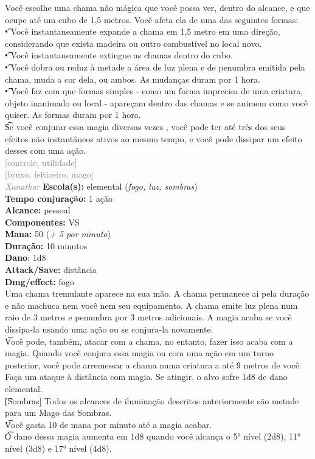\documentclass{RPG_Adventure}[2021/10/20]
\begin{document}
{\normalsize Você escolhe uma chama não mágica que você possa ver, dentro do alcance, e que ocupe até um cubo de 1,5 metros. Você afeta ela de uma das seguintes formas:\\\t • Você instantaneamente expande a chama em 1,5 metro em uma direção, considerando que exista madeira ou outro combustível no local novo.\\\t • Você instantaneamente extingue as chamas dentro do cubo.\\\t • Você dobra ou reduz à metade a área de luz plena e de penumbra emitida pela chama, muda a cor dela, ou ambos. As mudanças duram por 1 hora.\\\t • Você faz com que formas simples - como um forma imprecisa de uma criatura, objeto inanimado ou local - apareçam dentro das chamas e se animem como você quiser. As formas duram por 1 hora.\\\t Se você conjurar essa magia diversas vezes , você pode ter até três dos seus efeitos não instantâneos ativos ao mesmo tempo, e você pode dissipar um efeito desses com uma ação.\\}
{\scriptsize \textcolor{gray}{[controle, utilidade]\\}}
{\scriptsize \textcolor{gray}{[bruxo, feiticeiro, mago]\\}}
{\tiny \textcolor{gray}{\textit{Xanathar}}}
{\small \t \textbf{Escola(s):} elemental (\textit{fogo, luz, sombras})\\\t \textbf{Tempo conjuração:} 1 ação\\\t \textbf{Alcance:} pessoal\\\t \textbf{Componentes:} VS\\\t \textbf{Mana:} 50 (\textit{+ 5 por minuto})\\\t \textbf{Duração:} 10 minutos\\\t \textbf{Dano}: 1d8\\\t \textbf{Attack/Save:} distância\\\t \textbf{Dmg/effect:} fogo\\}
{\normalsize Uma chama tremulante aparece na sua mão. A chama permanece ai pela duração e não machuca nem você nem seu equipamento. A chama emite luz plena num raio de 3 metros e penumbra por 3 metros adicionais. A magia acaba se você dissipa-la usando uma ação ou se conjura-la novamente.\\\t Você pode, também, atacar com a chama, no entanto, fazer isso acaba com a magia. Quando você conjura essa magia ou com uma ação em um turno posterior, você pode arremessar a chama numa criatura a até 9 metros de você. Faça um ataque à distância com magia. Se atingir, o alvo sofre 1d8 de dano elemental.\\\t [Sombras] Todos os alcances de iluminação descritos anteriormente são metade para um Mago das Sombras.\\\t Você gasta 10 de mana por minuto até a magia acabar.\\\t O dano dessa magia aumenta em 1d8 quando você alcança o 5° nível (2d8), 11° nível (3d8) e 17° nível (4d8).\\}
\end{document}
